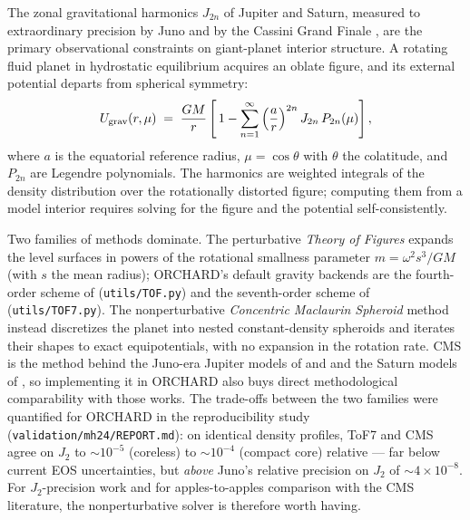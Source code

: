 \documentclass{aastex631}
\begin{document}
The zonal gravitational harmonics $J_{2n}$ of Jupiter and Saturn,
measured to extraordinary precision by Juno \citep{Iess2018} and by the
Cassini Grand Finale \citep{Iess2019}, are the primary observational
constraints on giant-planet interior structure.  A rotating fluid planet
in hydrostatic equilibrium acquires an oblate figure, and its external
potential departs from spherical symmetry:
\begin{equation}
U_{\rm grav}(r,\mu) \;=\; \frac{GM}{r}\left[\,1 -
\sum_{n=1}^{\infty} \left(\frac{a}{r}\right)^{2n} J_{2n}\,
P_{2n}(\mu)\right],
\label{eq:external}
\end{equation}
where $a$ is the equatorial reference radius, $\mu = \cos\theta$ with
$\theta$ the colatitude, and $P_{2n}$ are Legendre polynomials.  The
harmonics are weighted integrals of the density distribution over the
rotationally distorted figure; computing them from a model interior
requires solving for the figure and the potential self-consistently.

Two families of methods dominate.  The perturbative
\emph{Theory of Figures} \citep[ToF;][]{ZharkovTrubitsyn1978} expands the
level surfaces in powers of the rotational smallness parameter
$m = \omega^2 s^3 / GM$ (with $s$ the mean radius); ORCHARD's default
gravity backends are the fourth-order scheme of \citet{Nettelmann2017}
(\texttt{utils/TOF.py}) and the seventh-order scheme of
\citet{Nettelmann2021} (\texttt{utils/TOF7.py}).  The nonperturbative
\emph{Concentric Maclaurin Spheroid} method
\citep[CMS;][]{Hubbard2013} instead discretizes the planet into nested
constant-density spheroids and iterates their shapes to exact
equipotentials, with no expansion in the rotation rate.  CMS is the
method behind the Juno-era Jupiter models of \citet{Wahl2017} and
\citet{MilitzerHubbard2024} and the Saturn models of \citet{Militzer2019},
so implementing it in ORCHARD also buys direct methodological
comparability with those works.  The trade-offs between the two families
were quantified for ORCHARD in the \citet{MilitzerHubbard2024}
reproducibility study (\texttt{validation/mh24/REPORT.md}): on identical
density profiles, ToF7 and CMS agree on $J_2$ to
$\sim\!10^{-5}$ (coreless) to $\sim\!10^{-4}$ (compact core) relative ---
far below current EOS uncertainties, but \emph{above} Juno's relative
precision on $J_2$ of $\sim\!4\times10^{-8}$.  For $J_2$-precision work
and for apples-to-apples comparison with the CMS literature, the
nonperturbative solver is therefore worth having.
\end{document}
